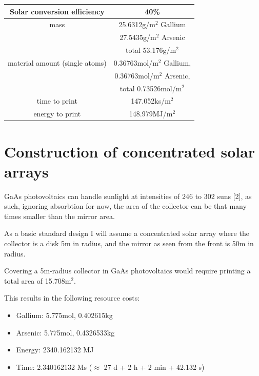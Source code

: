\documentclass[a4paper]{article}
\begin{document}
	\begin{center}
		\begin{tabular}{| c | c |}
			\hline
			Solar conversion efficiency & 40\% \\\hline
			mass & 25.6312g/m$^2$ Gallium \\
			& 27.5435g/m$^2$ Arsenic \\
			& total 53.176g/m$^2$ \\\hline
			material amount (single atoms) & 0.36763mol/m$^2$ Gallium,\\
			& 0.36763mol/m$^2$ Arsenic,\\
			& total 0.73526mol/m$^2$ \\\hline
			time to print & 147.052ks/m$^2$ \\\hline
			energy to print & 148.979MJ/m$^2$ \\\hline
		\end{tabular}
	\end{center}
	
	\pagebreak
	
	\section{Construction of concentrated solar arrays}
	
	GaAs photovoltaics can handle sunlight at intensities of 246 to 302 suns [2], as such, ignoring absorbtion for now, the area of the collector can be that many times smaller than the mirror area.
	
	\bigskip
	
	As a basic standard design I will assume a concentrated solar array where the collector is a disk 5m in radius, and the mirror as seen from the front is 50m in radius.
	
	\bigskip
	
	Covering a 5m-radius collector in GaAs photovoltaics would require printing a total area of 15.708m$^2$.
	
	This results in the following resource costs:
	
	\begin{itemize}
		\item Gallium: 5.775mol, 0.402615kg
		
		\item Arsenic: 5.775mol, 0.4326533kg
		
		\item Energy: 2340.162132 MJ
		
		\item Time: 2.340162132 Ms ($\approx$ 27 d + 2 h + 2 min + 42.132 s)
	\end{itemize}
	
\end{document}
